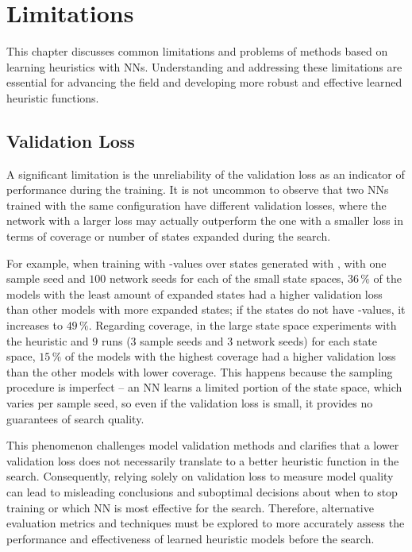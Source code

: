 \chapter{Limitations}
\label{sec:limitations}

This chapter discusses common limitations and problems of methods based on learning heuristics with NNs. Understanding and addressing these limitations are essential for advancing the field and developing more robust and effective learned heuristic functions.

\section{Validation Loss}

A significant limitation is the unreliability of the validation loss as an indicator of performance during the training. It is not uncommon to observe that two NNs trained with the same configuration have different validation losses, where the network with a larger loss may actually outperform the one with a smaller loss in terms of coverage or number of states expanded during the search.

For example, when training with \hstar-values over states generated with \bfsrw, with one sample seed and $100$ network seeds for each of the small state spaces, $36\,\%$ of the models with the least amount of expanded states had a higher validation loss than other models with more expanded states; if the states do not have \hstar-values, it increases to $49\,\%$. Regarding coverage, in the large state space experiments with the heuristic \hnnrs and $9$ runs ($3$ sample seeds and $3$ network seeds) for each state space, $15\,\%$ of the models with the highest coverage had a higher validation loss than the other models with lower coverage. This happens because the sampling procedure is imperfect -- an NN learns a limited portion of the state space, which varies per sample seed, so even if the validation loss is small, it provides no guarantees of search quality.

This phenomenon challenges model validation methods and clarifies that a lower validation loss does not necessarily translate to a better heuristic function in the search. Consequently, relying solely on validation loss to measure model quality can lead to misleading conclusions and suboptimal decisions about when to stop training or which NN is most effective for the search. Therefore, alternative evaluation metrics and techniques must be explored to more accurately assess the performance and effectiveness of learned heuristic models before the search.

